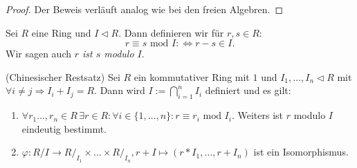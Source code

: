 \begin{proof}
    Der Beweis verläuft analog wie bei den freien Algebren.
\end{proof}


\begin{definition}
    Sei $R$ eine Ring und $I\triangleleft R$. Dann definieren wir für $r,s\in R$:
    $$r\equiv s\text{ mod }I:\Leftrightarrow r-s\in I.$$
    Wir sagen auch \emph{$r$ ist $s$ modulo $I$}.
\end{definition}

\begin{theorem}(Chinesischer Restsatz)
    Sei $R$ ein kommutativer Ring mit $1$ und $I_1,\ldots,I_n\triangleleft R$ mit $\forall i\neq j\Rightarrow I_i+I_j=R$.
    Dann wird $I:=\bigcap_{i=1}^nI_i$ definiert und es gilt:
    \begin{enumerate}
        \item $\forall r_1\ldots,r_n\in R\,\exists r\in R:\forall i\in\{1,\ldots,n\}:r\equiv r_i\text{ mod }I_i$. Weiters ist $r$
        modulo $I$ eindeutig bestimmt.
        \item $\varphi:R/I\to R/_{I_1}\times\ldots\times R/_{I_n}, r+I\mapsto (r*I_1,\ldots,r+I_n)$ ist ein Isomorphismus.
    \end{enumerate}
\end{theorem}


